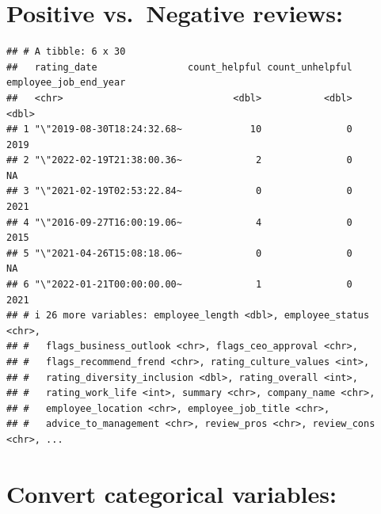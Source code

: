 \documentclass[
]{article}
\newenvironment{Shaded}{\begin{snugshade}}{\end{snugshade}}
\newcommand{\DecValTok}[1]{\textcolor[rgb]{0.00,0.00,0.81}{#1}}
\newcommand{\FunctionTok}[1]{\textcolor[rgb]{0.13,0.29,0.53}{\textbf{#1}}}
\newcommand{\NormalTok}[1]{#1}
\newcommand{\OtherTok}[1]{\textcolor[rgb]{0.56,0.35,0.01}{#1}}
\newcommand{\SpecialCharTok}[1]{\textcolor[rgb]{0.81,0.36,0.00}{\textbf{#1}}}
\newcommand{\StringTok}[1]{\textcolor[rgb]{0.31,0.60,0.02}{#1}}
\begin{document}
\section{Positive vs.~Negative
reviews:}\label{positive-vs.-negative-reviews}

\begin{Shaded}
\end{Shaded}

\begin{verbatim}
## # A tibble: 6 x 30
##   rating_date                count_helpful count_unhelpful employee_job_end_year
##   <chr>                              <dbl>           <dbl>                 <dbl>
## 1 "\"2019-08-30T18:24:32.68~            10               0                  2019
## 2 "\"2022-02-19T21:38:00.36~             2               0                    NA
## 3 "\"2021-02-19T02:53:22.84~             0               0                  2021
## 4 "\"2016-09-27T16:00:19.06~             4               0                  2015
## 5 "\"2021-04-26T15:08:18.06~             0               0                    NA
## 6 "\"2022-01-21T00:00:00.00~             1               0                  2021
## # i 26 more variables: employee_length <dbl>, employee_status <chr>,
## #   flags_business_outlook <chr>, flags_ceo_approval <chr>,
## #   flags_recommend_frend <chr>, rating_culture_values <int>,
## #   rating_diversity_inclusion <dbl>, rating_overall <int>,
## #   rating_work_life <int>, summary <chr>, company_name <chr>,
## #   employee_location <chr>, employee_job_title <chr>,
## #   advice_to_management <chr>, review_pros <chr>, review_cons <chr>, ...
\end{verbatim}

\section{Convert categorical
variables:}\label{convert-categorical-variables}
\end{document}
